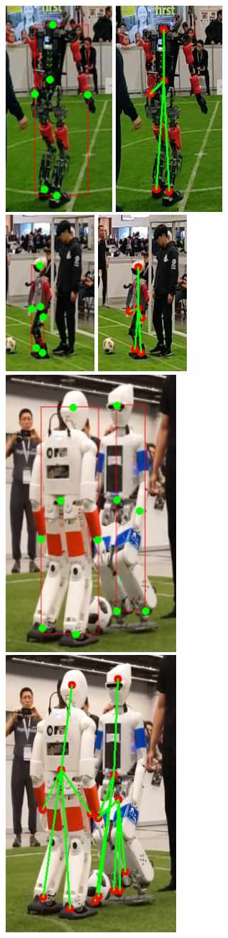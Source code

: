 \begin{figure}
  \\[\medskipamount]
  \includegraphics[width=.135\textwidth]{gambar/comp_with_gt/robot_4_gt.png}
  \includegraphics[width=.135\textwidth]{gambar/comp_with_gt/robot_4_res.png} \hfill%
  \includegraphics[width=.148\textwidth]{gambar/comp_with_gt/robot_5_gt.png}
  \includegraphics[width=.148\textwidth]{gambar/comp_with_gt/robot_5_res.png} \hfill%
  \includegraphics[width=.16\textwidth]{gambar/comp_with_gt/robot_6_gt.png}
  \includegraphics[width=.16\textwidth]{gambar/comp_with_gt/robot_6_res.png}

\end{figure}
